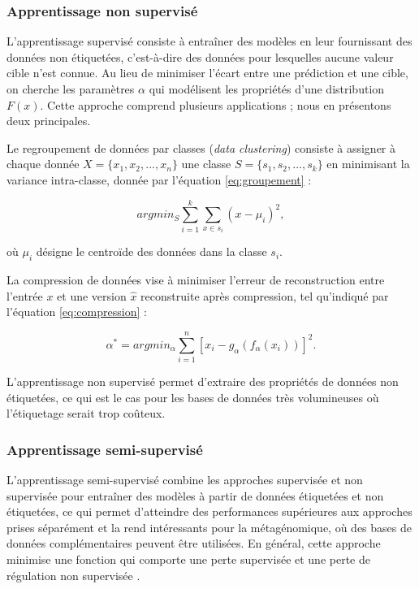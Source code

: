 \subsubsection{Apprentissage non supervisé}
L'apprentissage supervisé consiste à entraîner des modèles en leur fournissant des données non
étiquetées, c'est-à-dire des données pour lesquelles aucune valeur cible n'est connue. Au lieu de
minimiser l'écart entre une prédiction et une cible, on cherche les paramètres $\alpha$ qui
modélisent les propriétés d'une distribution $F(x)$. Cette approche comprend plusieurs applications
\cite{hasti2009}; nous en présentons deux principales.

Le regroupement de données par classes (\textit{data clustering}) consiste à assigner à chaque
donnée $X = \{x_1, x_2, ..., x_n\}$ une classe $S = \{s_1, s_2, ..., s_k\}$ en minimisant la variance
intra-classe, donnée par l'équation \ref{eq:groupement} :

\begin{equation}
    \label{eq:groupement}
    arg min_{S} \sum_{i=1}^{k} \sum_{x \in s_i} (x - \mu_i)^2,
\end{equation}

où $\mu_i$ désigne le centroïde des données dans la classe $s_i$.

La compression de données vise à minimiser l'erreur de reconstruction entre l'entrée $x$ et une
version $\hat{x}$ reconstruite après compression, tel qu'indiqué par l'équation
\ref{eq:compression} :

\begin{equation}
    \label{eq:compression}
    \alpha^* = arg min_{\alpha} \sum_{i = 1}^{n} \left[ x_i - g_\alpha (f_\alpha (x_i)) \right]^2.
\end{equation}

L'apprentissage non supervisé permet d'extraire des propriétés de données non étiquetées, ce qui est
le cas pour les bases de données très volumineuses où l'étiquetage serait trop coûteux.

\subsubsection{Apprentissage semi-supervisé}
L'apprentissage semi-supervisé combine les approches supervisée et non supervisée pour entraîner des
modèles à partir de données étiquetées et non étiquetées, ce qui permet d'atteindre des performances
supérieures aux approches prises séparément et la rend intéressants pour la métagénomique, où des
bases de données complémentaires peuvent être utilisées. En général, cette approche minimise une
fonction qui comporte une perte supervisée et une perte de régulation non supervisée
\cite{chapelle2006}.


